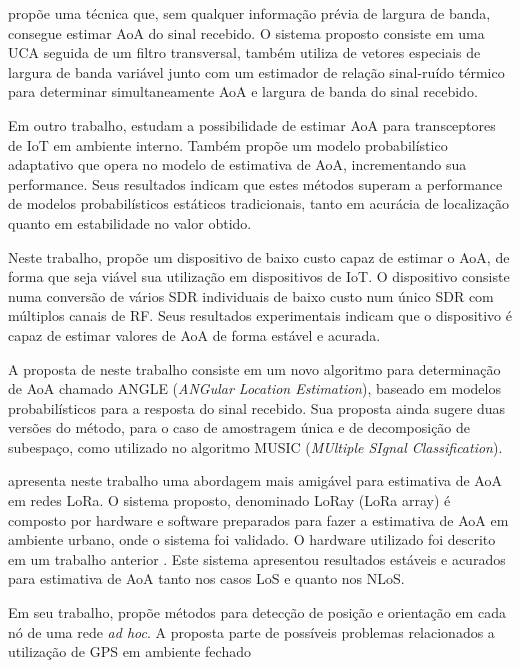 \citeauthor{bnilam20172d} \cite{bnilam20172d} propõe uma técnica que, sem qualquer informação prévia de largura de banda, consegue estimar \ac{AoA} do sinal recebido.
O sistema proposto consiste em uma \ac{UCA} seguida de um filtro transversal, também utiliza de vetores especiais de largura de banda variável junto com um estimador de relação sinal-ruído térmico para determinar simultaneamente \ac{AoA} e largura de banda do sinal recebido.

Em outro trabalho, \citeauthor{bnilam2017adaptive} \cite{bnilam2017adaptive} estudam a possibilidade de estimar \ac{AoA} para transceptores de \ac{IoT} em ambiente interno.
Também propõe um modelo probabilístico adaptativo que opera no modelo de estimativa de \ac{AoA}, incrementando sua performance.
Seus resultados indicam que estes métodos superam a performance de modelos probabilísticos estáticos tradicionais, tanto em acurácia de localização quanto em estabilidade no valor obtido.

Neste trabalho, \citeauthor{bnilam2019low} \cite{bnilam2019low} propõe um dispositivo de baixo custo capaz de estimar o \ac{AoA}, de forma que seja viável sua utilização em dispositivos de \ac{IoT}.
O dispositivo consiste numa conversão de vários \ac{SDR} individuais de baixo custo num único \ac{SDR} com múltiplos canais de \ac{RF}.
Seus resultados experimentais indicam que o dispositivo é capaz de estimar valores de \ac{AoA} de forma estável e acurada.

A proposta de \citeauthor{bnilam2020angle} \cite{bnilam2020angle} neste trabalho consiste em um novo algoritmo para determinação de \ac{AoA} chamado ANGLE (\textit{ANGular Location Estimation}), baseado em modelos probabilísticos para a resposta do sinal recebido.
Sua proposta ainda sugere duas versões do método, para o caso de amostragem única e de decomposição de subespaço, como utilizado no algoritmo MUSIC (\textit{MUltiple SIgnal Classification}).

\citeauthor{bnilam2020lora} \cite{bnilam2020lora} apresenta neste trabalho uma abordagem mais amigável para estimativa de \ac{AoA} em redes \ac{LoRa}.
O sistema proposto, denominado LoRay (\ac{LoRa} array) é composto por hardware e software preparados para fazer a estimativa de \ac{AoA} em ambiente urbano, onde o sistema foi validado.
O hardware utilizado foi descrito em um trabalho anterior \cite{bnilam2019low}.
Este sistema apresentou resultados estáveis e acurados para estimativa de \ac{AoA} tanto nos casos \ac{LoS} e quanto nos \ac{NLoS}.



Em seu trabalho, \citeauthor{niculescu2003ad} \cite{niculescu2003ad} propõe métodos para detecção de posição e orientação em cada nó de uma rede \textit{ad hoc}.
A proposta parte de possíveis problemas relacionados a utilização de \ac{GPS} em ambiente fechado

